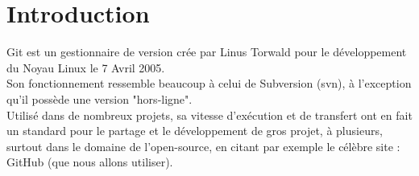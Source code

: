 \section*{Introduction}

Git est un gestionnaire de version crée par Linus Torwald pour le développement du Noyau Linux le 7 Avril 2005.\\
Son fonctionnement ressemble beaucoup à celui de Subversion (svn), à l'exception qu'il possède une version "hors-ligne".\\

Utilisé dans de nombreux projets, sa vitesse d'exécution et de transfert ont en fait un standard pour le partage et le développement de gros projet, à plusieurs, surtout dans le domaine de l'open-source, en citant par exemple le célèbre site : GitHub (que nous allons utiliser).